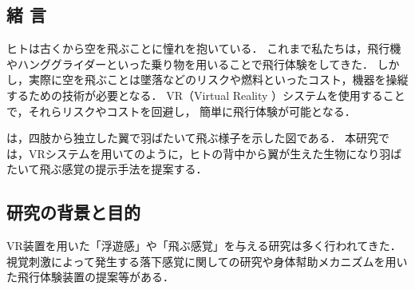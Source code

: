 \begin{small}

\section{緒   言}

  ヒトは古くから空を飛ぶことに憧れを抱いている．
  これまで私たちは，飛行機やハンググライダーといった乗り物を用いることで飛行体験をしてきた．
  しかし，実際に空を飛ぶことは墜落などのリスクや燃料といったコスト，機器を操縦するための技術が必要となる．
  VR（Virtual Reality
  ）システムを使用することで，それらリスクやコストを回避し，
  簡単に飛行体験が可能となる．

  は，四肢から独立した翼で羽ばたいて飛ぶ様子を示した図である．
  本研究では，VRシステムを用いてのように，ヒトの背中から翼が生えた生物になり羽ばたいて飛ぶ感覚の提示手法を提案する．
  

  \subsection{研究の背景と目的}
    VR装置を用いた「浮遊感」や「飛ぶ感覚」を与える研究は多く行われてきた．視覚刺激によって発生する落下感覚に関しての研究\cite{奥川夏輝2017VR空間における視覚刺激によって発生する落下感覚の分析}や身体幇助メカニズムを用いた飛行体験装置の提案\cite{鈴木拓馬2014hmd}等がある．



\end{small}
